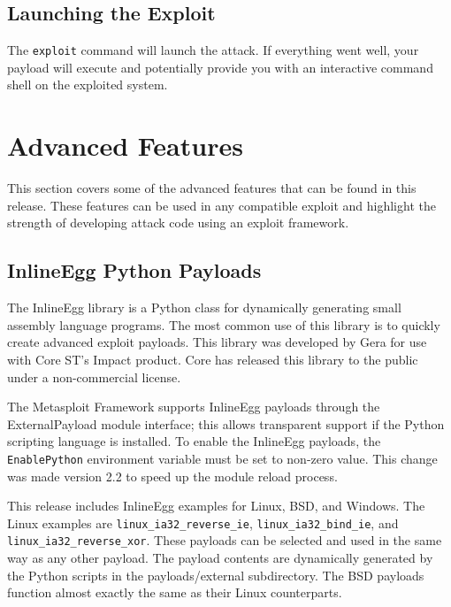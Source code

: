 \documentclass{report}
\begin{document}
	\section{Launching the Exploit}
\par
The \texttt{exploit} command will launch the attack. If everything went well, your
payload will execute and potentially provide you with an interactive command
shell on the exploited system. 


\pagebreak
\chapter{Advanced Features}

\par
This section covers some of the advanced features that can be found in this
release. These features can be used in any compatible exploit and highlight the
strength of developing attack code using an exploit framework. 

\section{InlineEgg Python Payloads}
\par
The InlineEgg library is a Python class for dynamically generating small
assembly language programs. The most common use of this library is to quickly
create advanced exploit payloads. This library was developed by Gera for use
with Core ST's Impact product. Core has released this library to the public
under a non-commercial license. 

\par
The Metasploit Framework supports InlineEgg payloads through the ExternalPayload
module interface; this allows transparent support if the Python scripting
language is installed. To enable the InlineEgg payloads, the
\texttt{EnablePython} environment variable must be set to non-zero value. This
change was made version 2.2 to speed up the module reload process. 

\par
This release includes InlineEgg examples for Linux, BSD, and Windows. The Linux
examples are \texttt{linux\_ia32\_reverse\_ie}, \texttt{linux\_ia32\_bind\_ie}, and
\texttt{linux\_ia32\_reverse\_xor}. These payloads can be selected and used in the same
way as any other payload. The payload contents are dynamically generated by the
Python scripts in the payloads/external subdirectory. The BSD payloads function
almost exactly the same as their Linux counterparts. 
\end{document}
